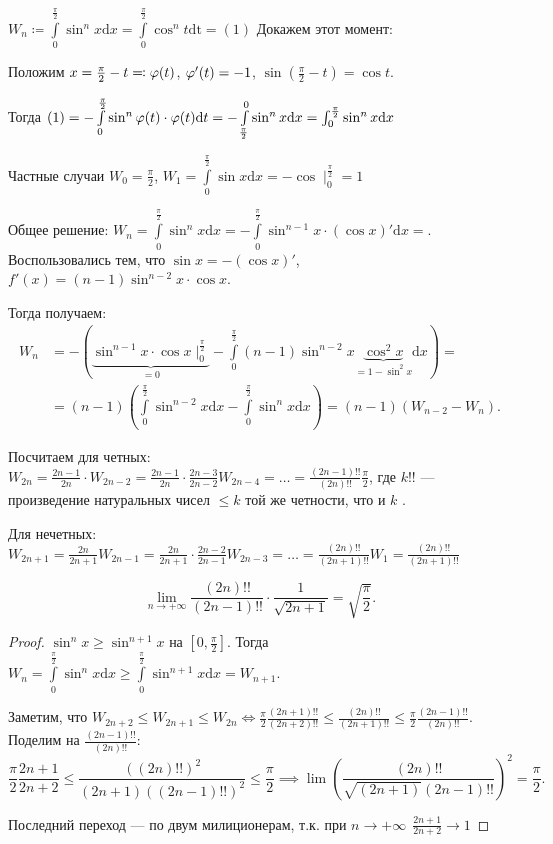 \begin{example}
    $W_n \coloneqq \int\limits_0^{\frac{\pi}{2}} \sin^n x \mathrm{d}x = \int\limits_0^{\frac{\pi}{2}}\cos^n t \mathrm{dt} = (1)$
    Докажем этот момент:

    Положим $x = \frac{\pi}{2} - t \eqqcolon \varphi(t)$, $\varphi'(t) = -1$,  $\sin(\frac{\pi}{2} - t) = \cos t$. 

    Тогда $(1) = -\int\limits_0^{\frac{\pi}{2}}\sin^n \varphi(t) \cdot \varphi(t) \mathrm{d}t = -\int\limits_{\frac{\pi}{2}}^0 \sin^n x \mathrm{d}x = \int_0^{\frac{\pi}2} \sin^n x \mathrm{d}x$

    Частные случаи $W_0 = \frac{\pi}{2}$, $W_1 = \int\limits_0^{\frac{\pi}{2}} \sin x \mathrm{d}x = -\cos \mid_0^{\frac{\pi}{2}} = 1$

    Общее решение: $W_n = \int\limits_0^{\frac{\pi}{2}} \sin^n x \mathrm{d}x = -\int\limits_0^{\frac{\pi}{2}} \sin^{n-1}x \cdot (\cos x)' \mathrm{d}x = $. Воспользовались тем, что $\sin x = -(\cos x)'$, $f'(x) = (n-1)\sin^{n-2} x \cdot \cos x$. 

    Тогда получаем: \begin{align*} W_n &= -\left(\underbrace{\sin^{n-1} x \cdot \cos x \mid_0^{\frac{\pi}{2}}}_{=0} - \int\limits_0^{\frac{\pi}{2}} (n-1)\sin^{n-2} x \underbrace{\cos^2 x}_{=1-\sin^2 x} \mathrm{d} x\right) = \\ & =(n-1)\left(\int\limits_{0}^{\frac{\pi}{2}} \sin^{n-2} x \mathrm{d}x - \int\limits_{0}^{\frac{\pi}{2}} \sin^n x \mathrm{d} x\right) = (n-1)(W_{n-2} - W_n).
    \end{align*}

    Посчитаем для четных: $W_{2n} = \frac{2n-1}{2n} \cdot W_{2n-2} = \frac{2n-1}{2n} \cdot \frac{2n-3}{2n - 2} W_{2n-4} = \ldots = \frac{(2n-1)!!}{(2n)!!} \frac{\pi}{2}$, где $k!!$  --- произведение натуральных чисел   $\le k$ той же четности, что и  $k$ .

    Для нечетных: $W_{2n + 1} = \frac{2n}{2n+1} W_{2n-1} = \frac{2n}{2n+1} \cdot \frac{2n-2}{2n-1}W_{2n-3} = \ldots = \frac{(2n)!!}{(2n+1)!!}W_1 = \frac{(2n)!!}{(2n+1)!!}$
\end{example}
\begin{theorem}
    \[
        \lim_{n\to +\infty} \frac{(2n)!!}{(2n-1)!!} \cdot \frac{1}{\sqrt{2n+1}} = \sqrt{\frac{\pi}{2}}
    .\] 
\end{theorem}
\begin{proof}
    $\sin^n x \ge \sin^{n+1} x$ на $[0, \frac{\pi}{2}]$. Тогда $W_n = \int\limits_0^{\frac{\pi}{2}} \sin^n x \mathrm{d}x \ge \int\limits_0^{\frac{\pi}{2}} \sin^{n+1} x \mathrm{d}x = W_{n+1}$.

    Заметим, что $W_{2n+2} \le W_{2n+1} \le W_{2n} \iff \frac{\pi}{2}\frac{(2n+1)!!}{(2n+2)!!} \le \frac{(2n)!!}{(2n+1)!!} \le \frac{\pi}{2} \frac{(2n-1)!!}{(2n)!!}$. Поделим на $\frac{(2n-1)!!}{(2n)!!}$:  \[
        \frac{\pi}{2} \frac{2n+1}{2n+2} \le \frac{((2n)!!)^2}{(2n+1)((2n-1)!!)^2} \le \frac{\pi}{2} \implies \lim \left(\frac{(2n)!!}{\sqrt{(2n+1)}(2n-1)!!}\right)^2 = \frac{\pi}{2}
    .\] 

    Последний переход --- по двум милиционерам, т.к. при $n \to +\infty\ \  \frac{2n+1}{2n + 2} \to 1$
\end{proof}
